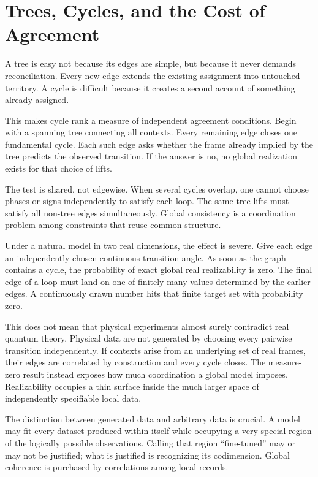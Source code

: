 \documentclass[12pt,openany]{book}
\begin{document}
\chapter{Trees, Cycles, and the Cost of Agreement}
A tree is easy not because its edges are simple, but because it never demands reconciliation. Every new edge extends the existing assignment into untouched territory. A cycle is difficult because it creates a second account of something already assigned.

This makes cycle rank a measure of independent agreement conditions. Begin with a spanning tree connecting all contexts. Every remaining edge closes one fundamental cycle. Each such edge asks whether the frame already implied by the tree predicts the observed transition. If the answer is no, no global realization exists for that choice of lifts.

The test is shared, not edgewise. When several cycles overlap, one cannot choose phases or signs independently to satisfy each loop. The same tree lifts must satisfy all non-tree edges simultaneously. Global consistency is a coordination problem among constraints that reuse common structure.

Under a natural model in two real dimensions, the effect is severe. Give each edge an independently chosen continuous transition angle. As soon as the graph contains a cycle, the probability of exact global real realizability is zero. The final edge of a loop must land on one of finitely many values determined by the earlier edges. A continuously drawn number hits that finite target set with probability zero.

This does not mean that physical experiments almost surely contradict real quantum theory. Physical data are not generated by choosing every pairwise transition independently. If contexts arise from an underlying set of real frames, their edges are correlated by construction and every cycle closes. The measure-zero result instead exposes how much coordination a global model imposes. Realizability occupies a thin surface inside the much larger space of independently specifiable local data.

The distinction between generated data and arbitrary data is crucial. A model may fit every dataset produced within itself while occupying a very special region of the logically possible observations. Calling that region ``fine-tuned'' may or may not be justified; what is justified is recognizing its codimension. Global coherence is purchased by correlations among local records.
\end{document}
